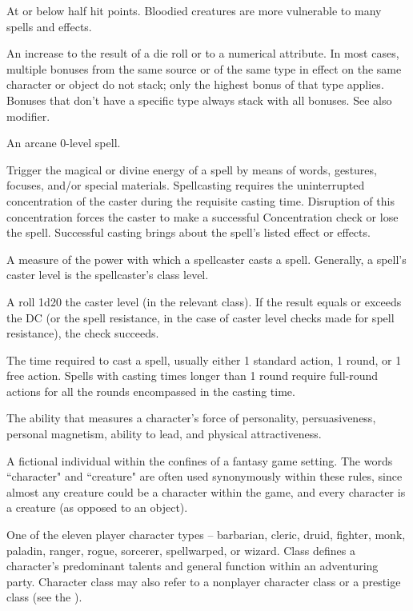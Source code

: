  At or below half hit points. Bloodied creatures are more vulnerable to many spells and effects.

 An increase to the result of a die roll or to a numerical attribute. In most cases, 
multiple bonuses from the same 
source or of the same type in 
effect on the same character or 
object do not stack; only the highest 
bonus of that type applies. Bonuses 
that don't have a specific type always 
stack with all bonuses. See also modifier.

 An arcane 0-level spell. 

 Trigger the magical or divine energy 
of a spell by means of words, gestures, focuses, and/or 
special materials. Spellcasting requires the uninterrupted 
concentration of the caster during the requisite casting 
time. Disruption of this concentration forces the caster to make a 
successful Concentration check or lose the spell. Successful casting 
brings about the spell's listed effect or effects. 

 A measure of the power with which a spellcaster 
casts a spell. Generally, a spell's caster level is the spellcaster's class 
level. 

 A roll 1d20 \add the caster level (in the relevant 
class). If the result equals or exceeds the DC (or the spell resistance, 
in the case of caster level checks made for spell resistance), the 
check succeeds. 

 The time required to cast a spell, usually either 1 
standard action, 1 round, or 1 free action. Spells with casting times 
longer than 1 round require full-round actions for all the rounds 
encompassed in the casting time. 

 The ability that measures a character's force of 
personality, persuasiveness, personal magnetism, ability to lead, and 
physical attractiveness. 

 A fictional individual within the confines of a fantasy 
game setting. The words ``character" and ``creature" are often used 
synonymously within these rules, since almost any creature could 
be a character within the game, and every character is a creature (as 
opposed to an object). 

 One of the eleven player character types --
barbarian, cleric, druid, fighter, monk, paladin, ranger, rogue, 
sorcerer, spellwarped, or wizard. Class defines a character's predominant talents 
and general function within an adventuring party. Character class 
may also refer to a nonplayer character class or a prestige class (see 
the ). 

